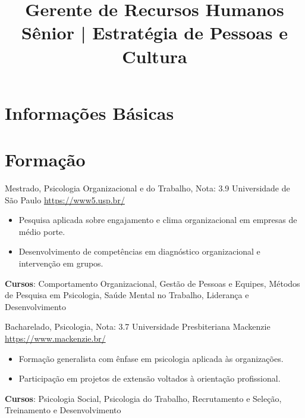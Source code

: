 \documentclass[a4paper, serif, 10pt]{moderncv}
\title{Gerente de Recursos Humanos Sênior | Estratégia de Pessoas e Cultura}
\begin{document}
\maketitle

\section{Informações Básicas}

\section{Formação}

        {Mestrado, Psicologia Organizacional e do Trabalho, Nota: 3.9}
        {Universidade de São Paulo}
        {\url{https://www5.usp.br/}}
        {}
        {\begin{itemize}
\item Pesquisa aplicada sobre engajamento e clima organizacional em empresas de médio porte.
\item Desenvolvimento de competências em diagnóstico organizacional e intervenção em grupos.
\end{itemize}
\textbf{Cursos}: Comportamento Organizacional, Gestão de Pessoas e Equipes, Métodos de Pesquisa em Psicologia, Saúde Mental no Trabalho, Liderança e Desenvolvimento}

        {Bacharelado, Psicologia, Nota: 3.7}
        {Universidade Presbiteriana Mackenzie}
        {\url{https://www.mackenzie.br/}}
        {}
        {\begin{itemize}
\item Formação generalista com ênfase em psicologia aplicada às organizações.
\item Participação em projetos de extensão voltados à orientação profissional.
\end{itemize}
\textbf{Cursos}: Psicologia Social, Psicologia do Trabalho, Recrutamento e Seleção, Treinamento e Desenvolvimento}
\end{document}
